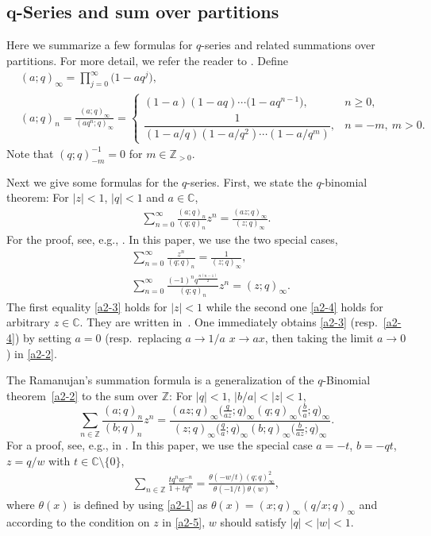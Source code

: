\documentclass[11pt]{article}
\numberwithin{equation}{section}
\numberwithin{equation}{section}
\def\C{\mathbb{C}}
\def\i{\infty}
\def\Z{\mathbb{Z}}
\begin{document}
\subsection[q-Series and sum over partitions]{$\boldsymbol{q}$-Series and sum over partitions}
\label{a2}
 Here we summarize a few formulas for $q$-series and related summations over partitions. For more detail, we refer the reader to \cite[Sections~10 and~11]{AndrewsAskeyRoy2000}. Define
\begin{align}
\label{a2-1}
 &(a;q)_\i = \prod_{j=0}^\i \big(1-a q^j\big),
 \\
\label{a2-1d}
 &(a;q)_n = \frac{(a;q)_\i}{(a q^n;q)_\i}
 =
 \begin{cases}
 (1-a)(1-aq)\cdots \big(1-a q^{n-1}\big), & n\ge 0,
 \\
 \dfrac{1}{(1-a/q)(1-a/q^2)\cdots(1-a/q^m)},& n=-m,~m>0.
 \end{cases}
\end{align}
Note that $(q;q)_{-m}^{-1}=0$ for $m\in\Z_{>0}$.


 Next we give some formulas for the $q$-series. First, we state the $q$-binomial theorem:
 For $|z|<1$, $|q|<1$ and $a\in\C$,
\begin{align}
\label{a2-2}
\sum_{n=0}^\i \frac{(a;q)_n}{(q;q)_n} z^n
=
\frac{(az;q)_\i}{(z;q)_{\i}}.
\end{align}
For the proof, see, e.g., \cite[Theorem 10.2.1]{AndrewsAskeyRoy2000}. In this paper,
we use the two special cases,
\begin{align}
\label{a2-3}
&\sum_{n=0}^\i \frac{z^n}{(q;q)_n}
=
\frac{1}{(z;q)_{\i}},
\\
 \label{a2-4}
&\sum_{n=0}^\i \frac{(-1)^n q^{\frac{n(n-1)}{2}}}{(q;q)_n} z^n
= (z;q)_\i.
\end{align}
 The first equality \eqref{a2-3} holds for $|z|<1$ while the second one \eqref{a2-4} holds for arbitrary $z\in\C$. They are written in~\cite[Corollary
 10.2.2\,(a) and (b)]{AndrewsAskeyRoy2000}.
 One immediately obtains \eqref{a2-3} (resp.~\eqref{a2-4})
 by setting $a=0$ (resp.\ replacing
 $a\rightarrow 1/a$ $x\rightarrow ax$, then taking the limit $a\rightarrow 0$) in \eqref{a2-2}.

 The Ramanujan's summation formula is a
 generalization of the $q$-Binomial
 theorem~\eqref{a2-2} to the sum over
 $\Z$: For $|q|<1$, $|b/a|<|z|<1$,
\begin{equation}
\label{a2-5}
\sum_{n\in\Z} \frac{(a;q)_n}{(b;q)_n} z^n
=
\frac{(az;q)_\i \big(\frac{q}{az};q\big)_\i (q;q)_\i \big(\frac{b}{a};q\big)_\i}
 {(z;q)_\i \big(\frac{q}{a};q\big)_\i (b;q)_\i \big(\frac{b}{az};q\big)_\i}.
\end{equation}
 For a proof, see, e.g., in \cite[Theorem 10.5.1]{AndrewsAskeyRoy2000}.
 In this paper, we use the special case
 $a=-t$, $b=-qt$, $z=q/w$ with
 $t\in \C\setminus\{0\}$,
\begin{align}
 \label{a2-6}
 \sum_{n\in\Z}\frac{t q^n w^{-n}}{1+tq^n}
 =
 \frac{\theta(-w/t)(q;q)_{\i}^2}
 {\theta(-1/t)\theta(w)},
\end{align}
 where $\theta (x)$ is defined by using
 \eqref{a2-1} as $\theta(x)=(x;q)_{\i}(q/x;q)_{\i}$
 and
 according to the condition on $z$ in \eqref{a2-5}, $w$ should satisfy $|q|<|w|<1$.
\end{document}
